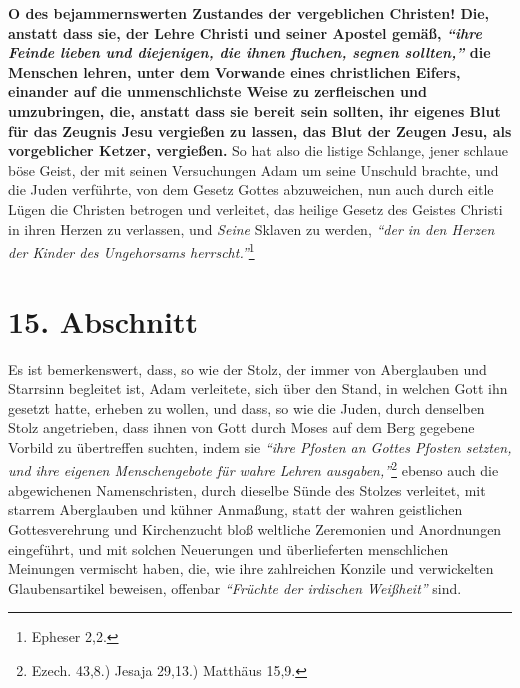 \label{ref:07_14_ketzer}
\textbf{O des bejammernswerten Zustandes der vergeblichen Christen! Die, anstatt
dass
sie, der Lehre Christi und seiner Apostel gemäß,
\textit{"`ihre Feinde lieben und
diejenigen, die ihnen fluchen, segnen sollten,"'}
die Menschen lehren, unter dem
Vorwande eines christlichen Eifers, einander auf die unmenschlichste Weise zu
zerfleischen und umzubringen, die, anstatt
dass sie bereit sein sollten, ihr
eigenes Blut für das Zeugnis Jesu vergießen zu lassen, das Blut der Zeugen Jesu,
als vorgeblicher Ketzer, vergießen.} So hat also die
listige Schlange, jener
schlaue böse Geist, der mit seinen Versuchungen Adam um
seine Unschuld
brachte, und die Juden verführte, von dem Gesetz
Gottes abzuweichen, nun
auch durch eitle Lügen die Christen betrogen und
verleitet, das heilige
Gesetz des Geistes Christi in ihren Herzen zu
verlassen, und \textit{Seine}
Sklaven zu werden,
\textit{"`der in den Herzen der Kinder des Ungehorsams
herrscht."'}\footnote{Epheser 2,2.}

\section{15. Abschnitt} \label{kap7_ab15}

Es ist bemerkenswert, dass, so wie der Stolz, der immer von
Aberglauben und
Starrsinn begleitet ist, Adam verleitete,
sich über den Stand, in welchen
Gott ihn gesetzt hatte, erheben zu wollen, und dass, so wie die
Juden, durch
denselben Stolz angetrieben, dass ihnen von Gott durch
Moses auf dem Berg
gegebene Vorbild zu übertreffen suchten, indem sie
\textit{"`ihre Pfosten an Gottes
Pfosten setzten, und ihre eigenen Menschengebote für wahre Lehren
ausgaben,"'}\footnote{Ezech. 43,8.) Jesaja 29,13.) Matthäus 15,9.}
ebenso auch die
abgewichenen Namenschristen, durch dieselbe
Sünde
des Stolzes verleitet, mit
starrem Aberglauben und kühner Anmaßung, statt
der wahren geistlichen
Gottesverehrung und Kirchenzucht
bloß weltliche Zeremonien und Anordnungen
eingeführt, und mit solchen Neuerungen und überlieferten menschlichen Meinungen
vermischt haben, die, wie ihre zahlreichen Konzile und
verwickelten
Glaubensartikel beweisen, offenbar
\textit{"`Früchte der irdischen Weißheit"'} sind.

